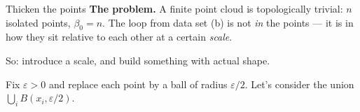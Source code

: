 \documentclass[10pt,aspectratio=169]{beamer}
\newcommand{\hexpoints}{%
    \foreach \i/\a in {1/0,2/60,3/120,4/180,5/240,6/300}{\coordinate (P\i) at (\a:1.5);}}
\newcommand{\hexdots}{\foreach \i in {1,...,6}{\fill[black] (P\i) circle (2pt);}}
\begin{document}
    \begin{frame}{Thicken the points}
        \textbf{The problem.} A finite point cloud is topologically trivial: $n$ isolated
        points, $\beta_0=n$.
        The loop from data set (b) is not \emph{in} the points --- it is in how they sit relative to each other at a certain \emph{scale}.

        \vspace{0.5em}
        So: introduce a scale, and build something with actual shape.\par
        \vspace{0.3em}
        \small
        Fix $\varepsilon>0$ and replace each point by a ball of radius $\varepsilon/2$.
        Let's consider the union $\bigcup_i B(x_i,\varepsilon/2)$.
        \begin{center}
        \end{center}
        \vspace{-0.3em}
    \end{frame}
\end{document}
